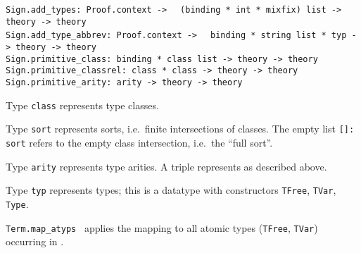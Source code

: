 \begin{isabellebody}
\begin{isamarkuptext}
\begin{mldecls}
  \verb|Sign.add_types: Proof.context ->|\isasep\isanewline%
\verb|  (binding * int * mixfix) list -> theory -> theory| \\
  \verb|Sign.add_type_abbrev: Proof.context ->|\isasep\isanewline%
\verb|  binding * string list * typ -> theory -> theory| \\
  \verb|Sign.primitive_class: binding * class list -> theory -> theory| \\
  \verb|Sign.primitive_classrel: class * class -> theory -> theory| \\
  \verb|Sign.primitive_arity: arity -> theory -> theory| \\
  \end{mldecls}

  \begin{description}

  \item Type \verb|class| represents type classes.

  \item Type \verb|sort| represents sorts, i.e.\ finite
  intersections of classes.  The empty list \verb|[]: sort| refers to
  the empty class intersection, i.e.\ the ``full sort''.

  \item Type \verb|arity| represents type arities.  A triple
   represents  as described above.

  \item Type \verb|typ| represents types; this is a datatype with
  constructors \verb|TFree|, \verb|TVar|, \verb|Type|.

  \item \verb|Term.map_atyps|~ applies the mapping  to all atomic types (\verb|TFree|, \verb|TVar|) occurring in
  .


\end{description}
\end{isamarkuptext}
\end{isabellebody}
